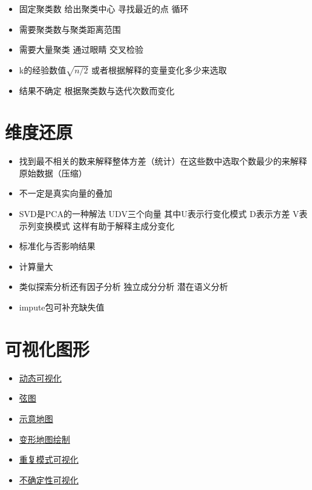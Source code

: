\documentclass[]{book}
\providecommand{\tightlist}{%
  \setlength{\itemsep}{0pt}\setlength{\parskip}{0pt}}
\begin{document}
\begin{itemize}
\tightlist
\item
  固定聚类数 给出聚类中心 寻找最近的点 循环
\item
  需要聚类数与聚类距离范围
\item
  需要大量聚类 通过眼睛 交叉检验
\item
  k的经验数值\(\sqrt{n/2}\) 或者根据解释的变量变化多少来选取
\item
  结果不确定 根据聚类数与迭代次数而变化
\end{itemize}

\section{维度还原}

\begin{itemize}
\tightlist
\item
  找到最不相关的数来解释整体方差（统计）在这些数中选取个数最少的来解释原始数据（压缩）
\item
  不一定是真实向量的叠加
\item
  SVD是PCA的一种解法 UDV三个向量 其中U表示行变化模式 D表示方差 V表示列变换模式 这样有助于解释主成分变化
\item
  标准化与否影响结果
\item
  计算量大
\item
  类似探索分析还有因子分析 独立成分分析 潜在语义分析
\item
  impute包可补充缺失值
\end{itemize}

\section{可视化图形}

\begin{itemize}
\tightlist
\item
  \href{https://github.com/thomasp85/tweenr}{动态可视化}
\item
  \href{https://github.com/jokergoo/circlize}{弦图}
\item
  \href{https://github.com/hafen/geofacet}{示意地图}
\item
  \href{https://github.com/sjewo/cartogram}{变形地图绘制}
\item
  \href{https://flowingdata.com/2018/07/09/how-to-visualize-recurring-patterns/}{重复模式可视化}
\item
  \href{https://flowingdata.com/2018/01/08/visualizing-the-uncertainty-in-data/}{不确定性可视化}
\end{itemize}
\end{document}
